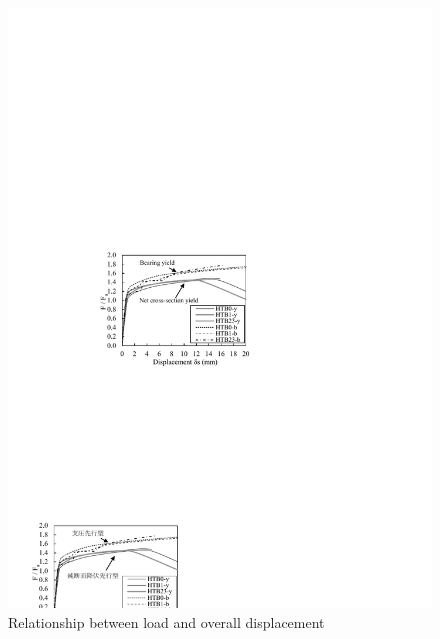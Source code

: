 \begin{figure}[htbp]
    \centering
    \begin{minipage}[t]{0.48\textwidth}
    \includegraphics[width=\linewidth]{imgs/ch4/fig16.pdf}
    \caption{Relationship between load and overall displacement}
    \label{ch4fig16}
    \end{minipage}
    \begin{minipage}[t]{0.48\textwidth}

\end{minipage}
\end{figure}
